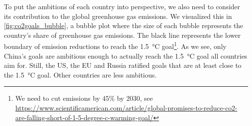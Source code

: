 To put the ambitions of each country into perspective, we also need to consider its contribution to the global greenhouse gas emissions. We visualized this in \autoref{fig:co2goals_bubble}, a bubble plot  where the size of each bubble represents the country's share of greenhouse gas emissions. The black line represents the lower boundary of emission reductions to reach the \SI{1.5}{\degreeCelsius} goal\footnote{We need to cut emissions by 45\% by 2030, see \url{https://www.scientificamerican.com/article/global-promises-to-reduce-co2-are-falling-short-of-1-5-degree-c-warming-goal/}}. As we see, only China's goals are ambitious enough to actually reach the \SI{1.5}{\degreeCelsius} goal all countries aim for. Still, the US, the EU and Russia ratified goals that are at least close to the \SI{1.5}{\degreeCelsius} goal. Other countries are less ambitious.

%


